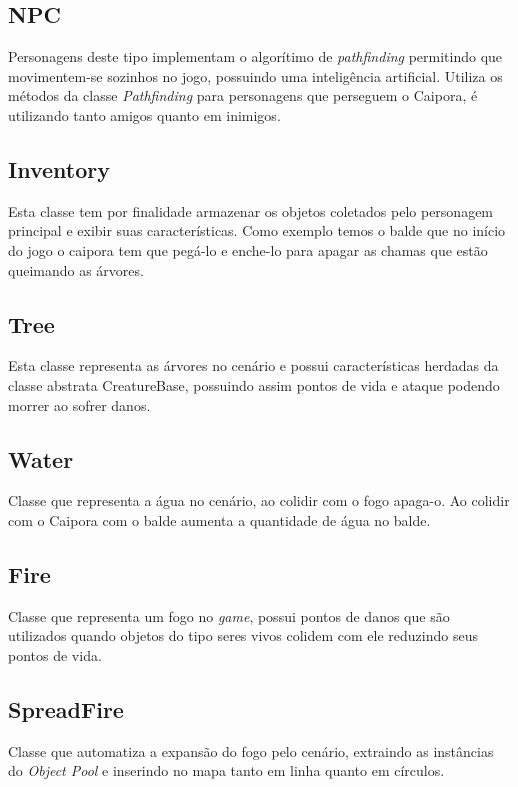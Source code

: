 \subsection{NPC}
Personagens deste tipo implementam o algorítimo de \textit{pathfinding}  permitindo que movimentem-se sozinhos no jogo, possuindo uma inteligência artificial. Utiliza os métodos da classe \textit{Pathfinding} para personagens que perseguem o Caipora, é utilizando tanto amigos quanto em inimigos.


\subsection{Inventory}
Esta classe tem por finalidade armazenar os objetos coletados pelo personagem principal e exibir suas características. Como exemplo temos o balde que no início do jogo o caipora tem que pegá-lo e enche-lo para apagar as chamas que estão queimando as árvores.


\subsection{Tree}
Esta classe representa as árvores no cenário e possui características herdadas da classe abstrata CreatureBase, possuindo assim pontos de vida e ataque podendo  morrer ao sofrer danos.


\subsection{Water}
Classe que representa a água no cenário, ao colidir com o fogo apaga-o. Ao colidir com o Caipora com o balde aumenta a quantidade de água no balde.


\subsection{Fire}
Classe que representa um fogo no \textit{game}, possui pontos de danos que são utilizados quando objetos do tipo seres vivos colidem com ele reduzindo seus pontos de vida.


\subsection{SpreadFire}
Classe que automatiza a expansão do fogo pelo cenário, extraindo as instâncias do \textit{Object Pool} e inserindo no mapa tanto em linha quanto em círculos.